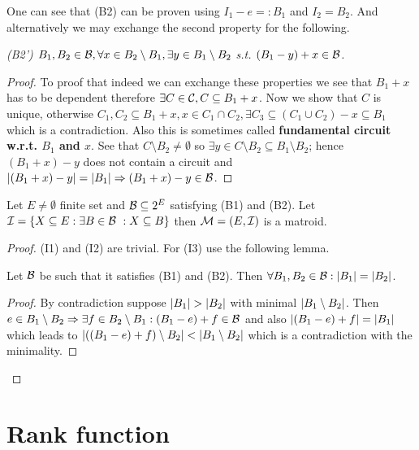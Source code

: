 One can see that (B2) can be proven using $I_1 - e =: B_1$ and $I_2 = B_2$. And alternatively we may exchange the second property for the following.

\noindent \textit{(B2') $B_1, B_2 \in \mathcal{B}, \forall x \in B_2 \setminus B_1, \exists y \in B_1 \setminus B_2$ s.t. $(B_1 - y) + x \in \mathcal{B}$.}

\begin{proof}
	To proof that indeed we can exchange these properties we see that $B_1 + x$ has to be dependent therefore $\exists C \in \mathcal{C}, C \subseteq B_1 + x$. Now we show that $C$ is unique, otherwise $C_1, C_2 \subseteq B_1 +x, x \in C_1 \cap C_2, \exists C_3 \subseteq (C_1 \cup C_2) - x \subseteq B_1$ which is a contradiction. Also this is sometimes called \textbf{fundamental circuit w.r.t. $B_1$ and $x$}. See that $C \setminus B_2 \neq \emptyset$ so $\exists y \in C \setminus B_2 \subseteq B_1 \setminus B_2$; hence $(B_1 + x) - y$ does not contain a circuit and $|(B_1 + x) - y| = |B_1| \Rightarrow (B_1 +x) - y \in \mathcal{B}$.
\end{proof}

\begin{prop}
	Let $E \neq \emptyset$ finite set and $\mathcal{B} \subseteq 2^E$ satisfying (B1) and (B2). Let $\mathcal{I} = \{X \subseteq E : \exists B \in \mathcal{B}\ : X \subseteq B\}$ then $\mathcal{M} = (E, \mathcal{I})$ is a matroid.
\end{prop}

\begin{proof}
	(I1) and (I2) are trivial. For (I3) use the following lemma.
	
	\begin{lemma}
		Let $\mathcal{B}$ be such that it satisfies (B1) and (B2). Then $\forall B_1, B_2 \in \mathcal{B} : |B_1| = |B_2|$.
	\end{lemma}
	
	\begin{proof}
		By contradiction suppose $\left|{B_1}\right| > \left|{B_2}\right|$ with minimal $\left|{B_1 \setminus B_2}\right|$. Then $e \in B_1 \setminus B_2 \Rightarrow \exists f \in B_2 \setminus B_1: (B_1 - e) + f \in \mathcal{B}$ and also $\left|{(B_1 - e) + f}\right| = |B_1|$ which leads to $\left|{((B_1 - e) + f) \setminus B_2}\right| < \left|{B_1 \setminus B_2}\right|$ which is a contradiction with the minimality.
	\end{proof}
\end{proof}

\section{Rank function}

